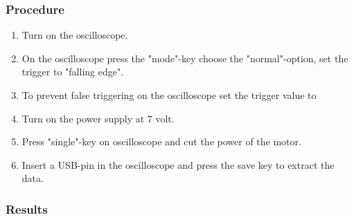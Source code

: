 \subsubsection{Procedure}

\begin{enumerate}
  \item Turn on the oscilloscope.
  \item On the oscilloscope press the "mode"-key choose the "normal"-option, set the trigger to "falling edge".
  \item To prevent false triggering on the oscilloscope set the trigger value to %
  \item Turn on the power supply at 7 volt.
  \item Press "single"-key on oscilloscope and cut the power of the motor.
  \item Insert a USB-pin in the oscilloscope and press the save key to extract the data.
\end{enumerate}

\subsubsection{Results}


